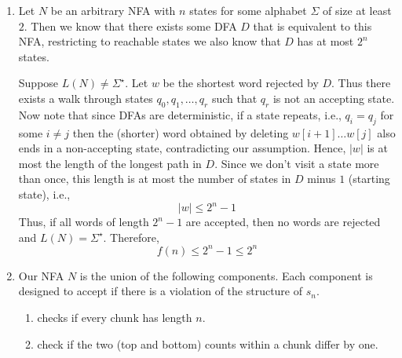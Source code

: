 \documentclass[12pt]{article}
\begin{document}
\begin{solution}
    \bbni 
    \begin{enumerate}
        \item [(a)] Let $N$ be an arbitrary NFA with $n$ states for some alphabet $\Sigma$ of size at least $2$. Then we know that there exists some DFA $D$ that is equivalent to this NFA, restricting to reachable states we also know that $D$ has at most $2^n$ states. 

        Suppose $L(N) \neq \Sigma^\star$. Let $w$ be the shortest word rejected by $D$. Thus there exists a walk through states $q_0, q_1, \ldots, q_r$ such that $q_r$ is not an accepting state. Now note that since DFAs are deterministic, if a state repeats, i.e., $q_i = q_j$ for some $i \neq j$ then the (shorter) word obtained by deleting $w[i+1] \ldots w[j]$ also ends in a non-accepting state, contradicting our assumption. Hence, $|w|$ is at most the length of the longest path in $D$. Since we don't visit a state more than once, this length is at most the number of states in $D$ minus $1$ (starting state), i.e., 
        \[|w| \leq 2^n-1\]
        Thus, if all words of length $2^n -1$ are accepted, then no words are rejected and $L(N) = \Sigma^\star$. Therefore, 
        \[f(n) \leq 2^n - 1 \leq 2^n\]

        \item [(b)] Our NFA $N$ is the union of the following components. Each component is designed to accept if there is a violation of the structure of $s_n$. 

        \begin{enumerate}
            \item [(i)] checks if every chunk has length $n$.
            
            \vspace{2in}
            \item[(ii)] check if the two (top and bottom) counts within a chunk differ by one.
            

\end{enumerate}
\end{enumerate}
\end{solution}
\end{document}
